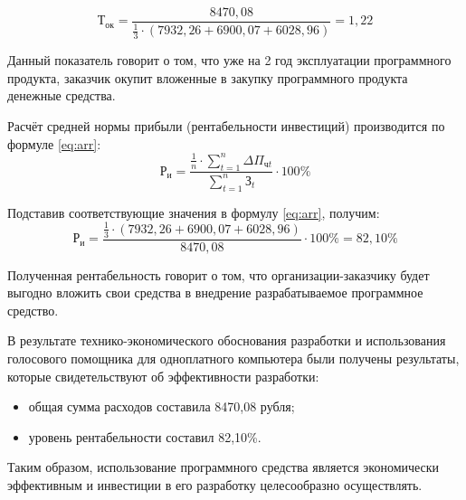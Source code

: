 \[
\text{Т}_{\text{ок}} = \frac{8470{,}08}{\frac{1}{3} \cdot (7932{,}26 + 6900{,}07 + 6028{,}96)} = 1{,}22 
\]

Данный показатель говорит о том, что уже на 2 год эксплуатации программного продукта, заказчик окупит вложенные в закупку программного продукта денежные средства.

Расчёт средней нормы прибыли (рентабельности инвестиций) производится по формуле \ref{eq:arr}: 
\begin{equation}
	\label{eq:arr}
	\mathrm{Р_{и}} = \frac{\frac{1}{n} \cdot \sum_{t=1}^n \Delta \Pi_{\text{ч}t}}{\sum_{t=1}^n \text{З}_t} \cdot 100\%
\end{equation}

Подставив соответствующие значения в формулу \ref{eq:arr}, получим:
\[
\mathrm{Р_{и}}  = \frac{\frac{1}{3} \cdot \left(7932{,}26 + 6900{,}07 + 6028{,}96\right)}{8470{,}08} \cdot 100\% = 82{,}10\%
\]

Полученная рентабельность говорит о том, что организации-заказчику будет выгодно вложить свои средства в внедрение разрабатываемое программное средство.

В результате технико-экономического обоснования разработки и использования голосового помощника для одноплатного компьютера были получены результаты, которые свидетельствуют об эффективности разработки:

\begin{itemize}
	\item общая сумма расходов составила 8470,08 рубля;
	\item уровень рентабельности составил 82,10\%.
\end{itemize}

Таким образом, использование программного средства является экономически эффективным и инвестиции в его разработку целесообразно осуществлять.


\newpage

